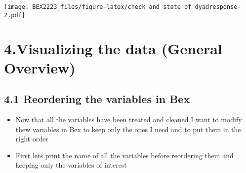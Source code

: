 \documentclass[
]{article}
\begin{document}
\texttt{[image: BEX2223\_files/figure-latex/check and state of dyadresponse-2.pdf]}

\hypertarget{visualizing-the-data-general-overview}{%
\section{4.Visualizing the data (General
Overview)}\label{visualizing-the-data-general-overview}}

\hypertarget{reordering-the-variables-in-bex}{%
\subsection{4.1 Reordering the variables in
Bex}\label{reordering-the-variables-in-bex}}

\begin{itemize}
\item
  Now that all the variables have been treated and cleaned I want to
  modify thew variables in Bex to keep only the ones I need and to put
  them in the right order
\item
  First lets print the name of all the variables before reordering them
  and keeping only the variables of interest
\end{itemize}
\end{document}
